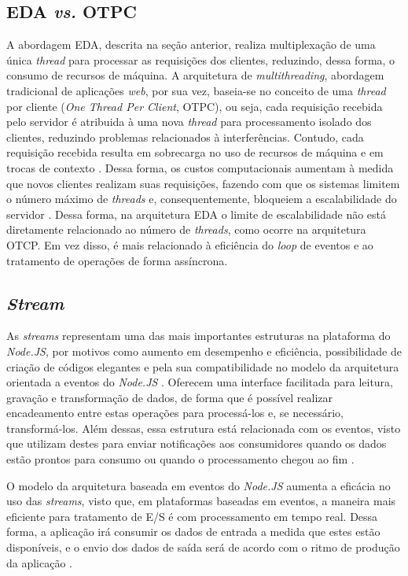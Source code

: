 \documentclass[12pt]{article}
\begin{document}
\subsection{EDA \textit{vs.} OTPC}

A abordagem EDA, descrita na seção anterior, realiza multiplexação de uma única \textit{thread} para processar 
as requisições dos clientes, reduzindo, dessa forma, o consumo de recursos de máquina. 
A arquitetura de \textit{multithreading}, abordagem tradicional de aplicações \textit{web}, por sua vez, baseia-se
no conceito de uma \textit{thread} por cliente (\textit{One Thread Per Client}, OTPC), ou seja, cada requisição
recebida pelo servidor é atribuida à uma nova \textit{thread} para processamento isolado dos clientes, reduzindo
problemas relacionados à interferências. Contudo, cada requisição recebida resulta em sobrecarga no uso de
recursos de máquina e em trocas de contexto \cite{JGD}. Dessa forma, os custos computacionais aumentam
à medida que novos clientes realizam suas requisições, fazendo com que os sistemas limitem o número máximo de
\textit{threads} e, consequentemente, bloqueiem a escalabilidade do servidor \cite{ZRHR}. Dessa forma, na arquitetura 
EDA o limite de escalabilidade não está diretamente relacionado ao número de \textit{threads}, como 
ocorre na arquitetura OTCP. Em vez disso, é mais relacionado 
à eficiência do \textit{loop} de eventos e ao tratamento de operações de forma assíncrona.


\subsection{\textit{Stream}}

As \textit{streams} representam uma das mais importantes estruturas na plataforma do \textit{Node.JS}, por motivos
como aumento em desempenho e eficiência, possibilidade de criação de códigos elegantes e pela sua compatibilidade
no modelo da arquitetura orientada a eventos do \textit{Node.JS} \cite[p. 119]{MARIO}. Oferecem uma interface facilitada 
para leitura, gravação e transformação de dados, de forma que é possível realizar encadeamento 
entre estas operações para processá-los e, se necessário, transformá-los. Além dessas, essa estrutura está 
relacionada com os eventos, visto que utilizam destes para enviar notificações aos consumidores 
quando os dados estão prontos para consumo ou quando o processamento chegou ao fim \cite[p. 28]{DIOGORESENDE}.

O modelo da arquitetura baseada em eventos do \textit{Node.JS} aumenta a eficácia no uso das \textit{streams}, visto que,
em plataformas baseadas em eventos, a maneira mais eficiente para tratamento de E/S é com processamento em tempo real.
Dessa forma, a aplicação irá consumir os dados de entrada a medida que estes estão disponíveis, e o envio dos dados
de saída será de acordo com o ritmo de produção da aplicação \cite[p. 119]{MARIO}.
\end{document}
